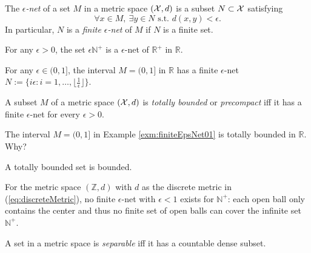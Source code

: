 \begin{defn}
  \label{def:epsNet}
  The \emph{$\epsilon$-net} of a set $M$ in a metric space $({\cal X},d)$
  is a subset $N\subset {\cal X}$ satisfying
  \begin{equation}
    \label{eq:epsNet}
    \forall x\in M,\ \exists y\in N \text{ s.t. }
    d(x,y)<\epsilon. 
  \end{equation}
  In particular,
  $N$ is a \emph{finite $\epsilon$-net} of $M$
  if $N$ is a finite set.
\end{defn}

\begin{exm}
  For any $\epsilon>0$,
  the set $\epsilon\mathbb{N}^+$
  is a $\epsilon$-net of $\mathbb{R}^+$
  in $\mathbb{R}$.
\end{exm}

\begin{exm}
  \label{exm:finiteEpsNet01}
  For any $\epsilon\in(0,1]$,
  the interval $M=(0,1]$ in $\mathbb{R}$
  has a finite $\epsilon$-net 
  $N:=\{i\epsilon: i=1,\ldots,\lfloor\frac{1}{\epsilon}\rfloor\}$.
\end{exm}

\begin{defn}
  \label{def:totalBoundedness}
  A subset $M$ of a metric space $({\cal X},d)$
  is \emph{totally bounded} or \emph{precompact} iff
  it has a finite $\epsilon$-net
  for every $\epsilon>0$. 
\end{defn}

\begin{exm}
  The interval $M=(0,1]$ in Example
  \ref{exm:finiteEpsNet01} is totally bounded in $\mathbb{R}$.
  Why? 
\end{exm}

\begin{lem}
  \label{lem:totalBoundedImpliesBounded}
  A totally bounded set is bounded. 
\end{lem}

\begin{exm}
  For the metric space $(\mathbb{Z},d)$
  with $d$ as the discrete metric in (\ref{eq:discreteMetric}),
  no finite $\epsilon$-net with $\epsilon<1$
  exists for $\mathbb{N}^+$:
  each open ball only contains the center
  and thus no finite set of open balls
  can cover the infinite set $\mathbb{N}^+$.
\end{exm}

\begin{defn}
  \label{def:separableMetricSpace}
  A set in a metric space is \emph{separable}
  iff it has a countable dense subset.
\end{defn}

